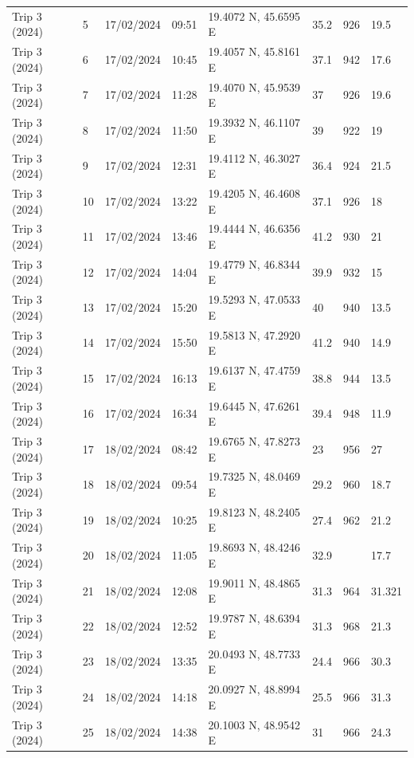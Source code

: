 \begin{scriptsize}
\begin{longtable}{llllllll}
Trip 3 (2024) & 5 & 17/02/2024 & 09:51 & 19.4072 N, 45.6595 E & 35.2 & 926 & 19.5 \\
Trip 3 (2024) & 6 & 17/02/2024 & 10:45 & 19.4057 N, 45.8161 E & 37.1 & 942 & 17.6 \\
Trip 3 (2024) & 7 & 17/02/2024 & 11:28 & 19.4070 N, 45.9539 E & 37 & 926 & 19.6 \\
Trip 3 (2024) & 8 & 17/02/2024 & 11:50 & 19.3932 N, 46.1107 E & 39 & 922 & 19 \\
Trip 3 (2024) & 9 & 17/02/2024 & 12:31 & 19.4112 N, 46.3027 E & 36.4 & 924 & 21.5 \\
Trip 3 (2024) & 10 & 17/02/2024 & 13:22 & 19.4205 N, 46.4608 E & 37.1 & 926 & 18 \\
Trip 3 (2024) & 11 & 17/02/2024 & 13:46 & 19.4444 N, 46.6356 E & 41.2 & 930 & 21 \\
Trip 3 (2024) & 12 & 17/02/2024 & 14:04 & 19.4779 N, 46.8344 E & 39.9 & 932 & 15 \\
Trip 3 (2024) & 13 & 17/02/2024 & 15:20 & 19.5293 N, 47.0533 E & 40 & 940 & 13.5 \\
Trip 3 (2024) & 14 & 17/02/2024 & 15:50 & 19.5813 N, 47.2920 E & 41.2 & 940 & 14.9 \\
Trip 3 (2024) & 15 & 17/02/2024 & 16:13 & 19.6137 N, 47.4759 E & 38.8 & 944 & 13.5 \\
Trip 3 (2024) & 16 & 17/02/2024 & 16:34 & 19.6445 N, 47.6261 E & 39.4 & 948 & 11.9 \\
Trip 3 (2024) & 17 & 18/02/2024 & 08:42 & 19.6765 N, 47.8273 E & 23 & 956 & 27 \\
Trip 3 (2024) & 18 & 18/02/2024 & 09:54 & 19.7325 N, 48.0469 E & 29.2 & 960 & 18.7 \\
Trip 3 (2024) & 19 & 18/02/2024 & 10:25 & 19.8123 N, 48.2405 E & 27.4 & 962 & 21.2 \\
Trip 3 (2024) & 20 & 18/02/2024 & 11:05 & 19.8693 N, 48.4246 E & 32.9 & \textemdash{} & 17.7 \\
Trip 3 (2024) & 21 & 18/02/2024 & 12:08 & 19.9011 N, 48.4865 E & 31.3 & 964 & 31.321 \\
Trip 3 (2024) & 22 & 18/02/2024 & 12:52 & 19.9787 N, 48.6394 E & 31.3 & 968 & 21.3 \\
Trip 3 (2024) & 23 & 18/02/2024 & 13:35 & 20.0493 N, 48.7733 E & 24.4 & 966 & 30.3 \\
Trip 3 (2024) & 24 & 18/02/2024 & 14:18 & 20.0927 N, 48.8994 E & 25.5 & 966 & 31.3 \\
Trip 3 (2024) & 25 & 18/02/2024 & 14:38 & 20.1003 N, 48.9542 E & 31 & 966 & 24.3 \\

\end{longtable}
\end{scriptsize}
